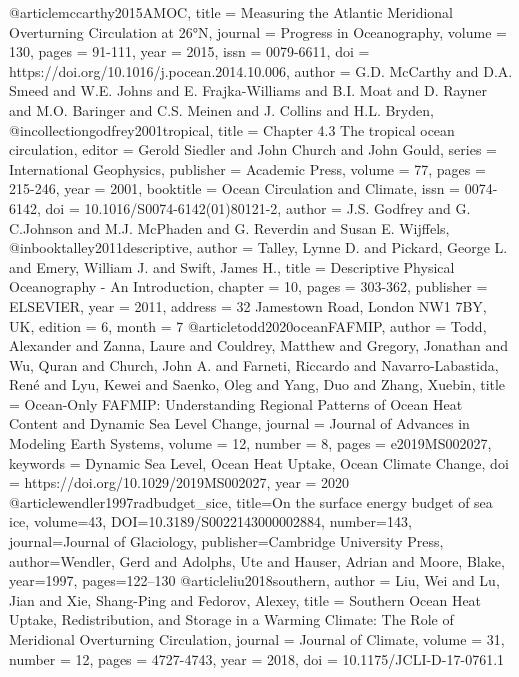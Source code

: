 @article{mccarthy2015AMOC,
title = {{Measuring the Atlantic Meridional Overturning Circulation at 26°N}},
journal = {Progress in Oceanography},
volume = {130},
pages = {91-111},
year = {2015},
issn = {0079-6611},
doi = {https://doi.org/10.1016/j.pocean.2014.10.006},
author = {G.D. McCarthy and D.A. Smeed and W.E. Johns and E. Frajka-Williams and B.I. Moat and D. Rayner and M.O. Baringer and C.S. Meinen and J. Collins and H.L. Bryden},
}
@incollection{godfrey2001tropical,
 title = {{Chapter 4.3 The tropical ocean circulation}},
 editor = {Gerold Siedler and John Church and John Gould},
 series = {International Geophysics},
 publisher = {Academic Press},
 volume = {77},
 pages = {215-246},
 year = {2001},
 booktitle = {Ocean Circulation and Climate},
 issn = {0074-6142},
 doi = {10.1016/S0074-6142(01)80121-2},
 author = {J.S. Godfrey and G. C.Johnson and M.J. McPhaden and G. Reverdin and Susan E. Wijffels},
}
@inbook{talley2011descriptive,
 author       = {Talley, Lynne D. and Pickard, George L. and Emery, William J. and Swift, James H.},
 title        = {{Descriptive Physical Oceanography - An Introduction}},
 chapter      = 10,
 pages        = {303-362},
 publisher    = {ELSEVIER},
 year         = 2011,
 address      = {32 Jamestown Road, London NW1 7BY, UK},
 edition      = 6,
 month        = 7
}
@article{todd2020oceanFAFMIP,
author = {Todd, Alexander and Zanna, Laure and Couldrey, Matthew and Gregory, Jonathan and Wu, Quran and Church, John A. and Farneti, Riccardo and Navarro-Labastida, René and Lyu, Kewei and Saenko, Oleg and Yang, Duo and Zhang, Xuebin},
title = {{Ocean-Only FAFMIP: Understanding Regional Patterns of Ocean Heat Content and Dynamic Sea Level Change}},
journal = {Journal of Advances in Modeling Earth Systems},
volume = {12},
number = {8},
pages = {e2019MS002027},
keywords = {Dynamic Sea Level, Ocean Heat Uptake, Ocean Climate Change},
doi = {https://doi.org/10.1029/2019MS002027},
year = {2020}
}
@article{wendler1997radbudget_sice,
title={{On the surface energy budget of sea ice}},
volume={43},
DOI={10.3189/S0022143000002884},
number={143}, journal={Journal of Glaciology}, publisher={Cambridge University Press}, author={Wendler, Gerd and Adolphs, Ute and Hauser, Adrian and Moore, Blake}, year={1997}, pages={122–130}
}
@article{liu2018southern,
 author = {Liu, Wei and Lu, Jian and Xie, Shang-Ping and Fedorov, Alexey},
 title = {{Southern Ocean Heat Uptake, Redistribution, and Storage in a Warming Climate: The Role of Meridional Overturning Circulation}},
 journal = {Journal of Climate},
 volume = {31},
 number = {12},
 pages = {4727-4743},
 year = {2018},
 doi = {10.1175/JCLI-D-17-0761.1}
}
